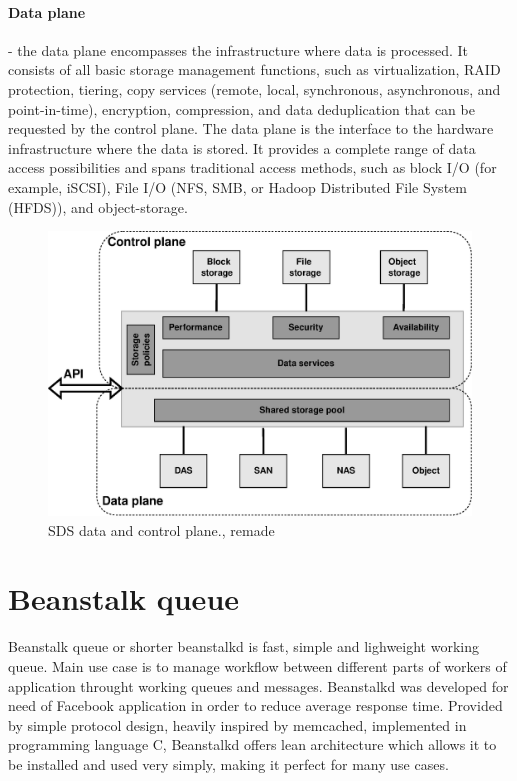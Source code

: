     \paragraph{Data plane}
    - the data plane encompasses the infrastructure where data is processed. It consists of all basic storage management functions, such as virtualization, RAID protection, tiering, copy services (remote, local, synchronous, asynchronous, and point-in-time), encryption, compression, and data deduplication that can be requested by the control plane. The data plane is the interface to the hardware infrastructure where the data is stored. It provides a complete range of data access possibilities and spans traditional access methods, such as block I/O (for example, iSCSI), File I/O (NFS, SMB, or Hadoop Distributed File System (HFDS)), and object-storage\cite{sdsIBMSDSGuide}.

    \begin{figure}[hbt]
        \centering
        \includegraphics[width=1\textwidth]{obrazky-figures/sds-planes.eps}
        \caption{SDS data and control plane.\cite{sdsPlanes}, remade}
        \label{fig:beanstalkdJobSM}
    \end{figure}

\section{Beanstalk queue}

    Beanstalk queue or shorter beanstalkd is fast, simple and lighweight working queue\cite{}. Main use case is to manage workflow between different parts of workers of application throught working queues and messages. Beanstalkd was developed for need of Facebook application in order to reduce average response time\cite{beanstalkdOfficial}. Provided by simple protocol design, heavily inspired by memcached, implemented in programming language C, Beanstalkd offers lean architecture which allows it to be installed and used very simply, making it perfect for many use cases\cite{beanstalkdInstall}.


